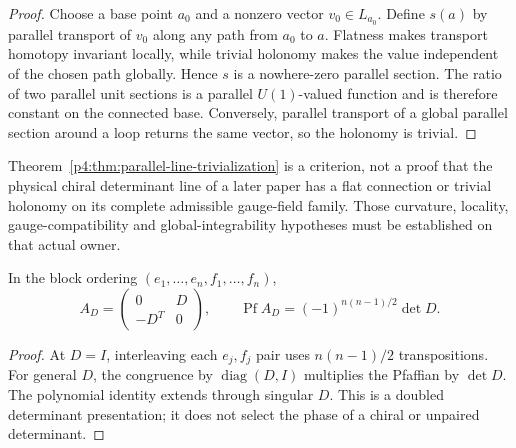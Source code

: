 \documentclass[12pt,a4paper]{article}
\begin{document}
\begin{proof}
Choose a base point $a_0$ and a nonzero vector $v_0\in L_{a_0}$.  Define
$s(a)$ by parallel transport of $v_0$ along any path from $a_0$ to $a$.
Flatness makes transport homotopy invariant locally, while trivial holonomy
makes the value independent of the chosen path globally.  Hence $s$ is a
nowhere-zero parallel section.  The ratio of two parallel unit sections is a
parallel $U(1)$-valued function and is therefore constant on the connected
base.  Conversely, parallel transport of a global parallel section around a
loop returns the same vector, so the holonomy is trivial.
\end{proof}

\begin{remark}
\label{p4:rem:parallel-line-chiral-firewall}
Theorem~\ref{p4:thm:parallel-line-trivialization} is a criterion, not a proof
that the physical chiral determinant line of a later paper has a flat
connection or trivial holonomy on its complete admissible gauge-field family.
Those curvature, locality, gauge-compatibility and global-integrability
hypotheses must be established on that actual owner.
\end{remark}

\begin{corollary}
\label{p4:cor:doubled-pfaffian-presentation}
\leavevmode\par\noindent
In the block ordering \((e_1,\ldots,e_n,f_1,\ldots,f_n)\),
\[
 A_D=\begin{pmatrix}0&D\\-D^T&0\end{pmatrix},
 \qquad
 \operatorname{Pf}A_D=(-1)^{n(n-1)/2}\det D.
\]
\end{corollary}
\begin{proof}
At \(D=I\), interleaving each \(e_j,f_j\) pair uses
\(n(n-1)/2\) transpositions.  For general \(D\), the congruence
by \(\operatorname{diag}(D,I)\) multiplies the Pfaffian by
\(\det D\).  The polynomial identity extends through singular
\(D\).  This is a doubled determinant presentation; it does not
select the phase of a chiral or unpaired determinant.
\end{proof}
\end{document}

